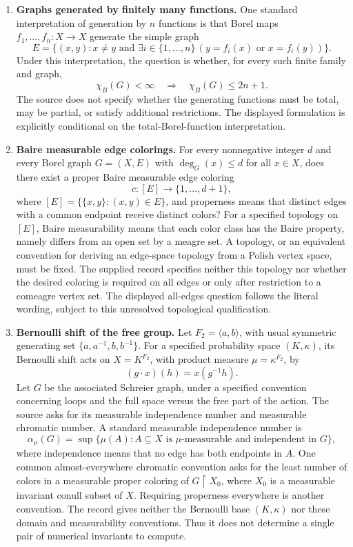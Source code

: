 \documentclass[11pt]{article}
\begin{document}
\begin{enumerate}
\item \textbf{Graphs generated by finitely many functions.} One standard interpretation of generation by \(n\) functions is that Borel maps \(f_1,\ldots,f_n:X\to X\) generate the simple graph
\[
E=\{(x,y):x\ne y\text{ and }\exists i\in\{1,\ldots,n\}\,
(y=f_i(x)\text{ or }x=f_i(y))\}.
\]
Under this interpretation, the question is whether, for every such finite family and graph,
\[
\chi_B(G)<\infty\quad\Longrightarrow\quad\chi_B(G)\leq2n+1.
\]
The source does not specify whether the generating functions must be total, may be partial, or satisfy additional restrictions. The displayed formulation is explicitly conditional on the total-Borel-function interpretation.

\item \textbf{Baire measurable edge colorings.} For every nonnegative integer \(d\) and every Borel graph \(G=(X,E)\) with \(\deg_G(x)\leq d\) for all \(x\in X\), does there exist a proper Baire measurable edge coloring
\[
c:[E]\to\{1,\ldots,d+1\},
\]
where \([E]=\{\{x,y\}:(x,y)\in E\}\), and properness means that distinct edges with a common endpoint receive distinct colors? For a specified topology on \([E]\), Baire measurability means that each color class has the Baire property, namely differs from an open set by a meagre set. A topology, or an equivalent convention for deriving an edge-space topology from a Polish vertex space, must be fixed. The supplied record specifies neither this topology nor whether the desired coloring is required on all edges or only after restriction to a comeagre vertex set. The displayed all-edges question follows the literal wording, subject to this unresolved topological qualification.

\item \textbf{Bernoulli shift of the free group.} Let \(F_2=\langle a,b\rangle\), with usual symmetric generating set \(\{a,a^{-1},b,b^{-1}\}\). For a specified probability space \((K,\kappa)\), its Bernoulli shift acts on \(X=K^{F_2}\), with product measure \(\mu=\kappa^{F_2}\), by
\[
(g\cdot x)(h)=x(g^{-1}h).
\]
Let \(G\) be the associated Schreier graph, under a specified convention concerning loops and the full space versus the free part of the action. The source asks for its measurable independence number and measurable chromatic number. A standard measurable independence number is
\[
\alpha_\mu(G)=\sup\{\mu(A):A\subseteq X\text{ is }\mu\text{-measurable and independent in }G\},
\]
where independence means that no edge has both endpoints in \(A\). One common almost-everywhere chromatic convention asks for the least number of colors in a measurable proper coloring of \(G\upharpoonright X_0\), where \(X_0\) is a measurable invariant conull subset of \(X\). Requiring properness everywhere is another convention. The record gives neither the Bernoulli base \((K,\kappa)\) nor these domain and measurability conventions. Thus it does not determine a single pair of numerical invariants to compute.
\end{enumerate}
\end{document}
